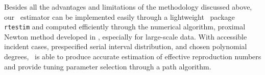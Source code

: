 Besides all the advantages and limitations of the methodology discussed above, 
our \RtEstim\ estimator can be implemented easily through a lightweight \R\ 
package \texttt{rtestim} and computed efficiently through the numerical algorithm, 
proximal Newton method developed in \cpp, especially for large-scale data. 
With accessible incident cases, prespecified serial interval distribution, and
chosen polynomial degrees, \RtEstim\ is able to produce accurate estimation 
of effective reproduction numbers and provide tuning parameter selection through a path algorithm. 
